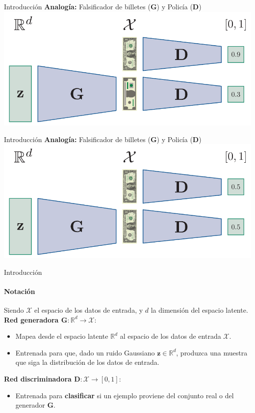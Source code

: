 \documentclass[aspectratio=169]{beamer}
\begin{document}
\begin{frame}{Introducción}
	\textbf{Analogía:} Falsificador de billetes ($\textbf{G}$) y Policía ($\textbf{D}$)\\
	\vspace{.3cm}
	\includegraphics[width=.75\textwidth, center]{imgs/tema4/gan/gan_ex3.pdf}\\
	\vspace{.3cm}
\end{frame}


\begin{frame}{Introducción}
	\textbf{Analogía:} Falsificador de billetes ($\textbf{G}$) y Policía ($\textbf{D}$)\\
	\vspace{.3cm}
	\includegraphics[width=.75\textwidth, center]{imgs/tema4/gan/gan_ex4.pdf}\\
	\vspace{.3cm}
\end{frame}



\begin{frame}[t]{Introducción}
	\framesubtitle{Notación}	
	Siendo $\mathcal{X}$ el espacio de los datos de entrada, y $d$ la dimensión del espacio latente.\\
	\vspace{.5cm}
	\textbf{Red generadora $\textbf{G}:\mathbb{R}^{d} \to \mathcal{X}$}:
	\begin{itemize}
		\item Mapea desde el espacio latente $\mathbb{R}^{d}$ al espacio de los datos de entrada $\mathcal{X}$.
		\item Entrenada para que, dado un ruido Gaussiano $\mathbf z\in\mathbb R^d$, produzca una muestra que siga la distribución de los datos de entrada.
	\end{itemize}
	\vspace{.5cm}
	\textbf{Red discriminadora $\textbf{D}:\mathcal{X} \to [0,1]$}:
	\begin{itemize}
		\item Entrenada para \textbf{clasificar} si un ejemplo proviene del conjunto real o del generador $\textbf{G}.$
	\end{itemize}
\end{frame}
\end{document}
